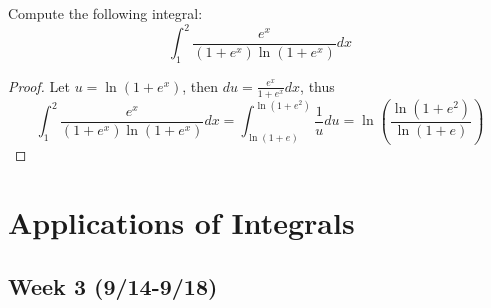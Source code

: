 \documentclass[openany]{book}
\begin{document}
\begin{prob}
    Compute the following integral:
    \begin{equation*}
        \int_1^2\frac{e^x}{(1+e^x)\ln(1+e^x)}dx
    \end{equation*}
\end{prob}
\begin{proof}
    Let $u=\ln(1+e^x)$, then $du=\frac{e^x}{1+e^x}dx$, thus 
    \begin{equation*}
        \int_1^2\frac{e^x}{(1+e^x)\ln(1+e^x)}dx=\int_{\ln(1+e)}^{\ln(1+e^2)}\frac{1}{u}du=\ln\left(\frac{\ln(1+e^2)}{\ln(1+e)}\right)
    \end{equation*}
\end{proof}

\chapter{Applications of Integrals}
\section*{\centering Week 3 (9/14-9/18)}
\end{document}
